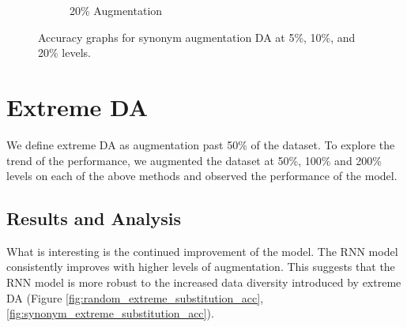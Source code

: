 \documentclass[10pt]{extarticle}
\begin{document}
\begin{figure}[ht]
\begin{subfigure}[b]{0.3\textwidth}
    \caption{20\% Augmentation}
    \label{fig:synonym_20}
  \end{subfigure}
  \caption{Accuracy graphs for synonym augmentation DA at 5\%, 10\%, and 20\% levels.}
  \label{fig:synonym_substitution_acc}
\end{figure}

\section{Extreme DA}

We define extreme DA as augmentation past 50\% of the dataset. To explore the
trend of the performance, we augmented the dataset at 50\%, 100\% and 200\%
levels on each of the above methods and observed the performance of the model.

\subsection{Results and Analysis}

What is interesting is the continued improvement of the model. The RNN model
consistently improves with higher levels of augmentation. This suggests that
the RNN model is more robust to the increased data diversity introduced by
extreme DA (Figure \ref{fig:random_extreme_substitution_acc},
\ref{fig:synonym_extreme_substitution_acc}).
\end{document}
